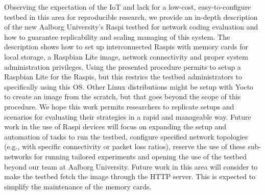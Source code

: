 \label{sec:conclusions}
Observing the expectation of the \ac{IoT} and lack for a low-cost, easy-to-configure testbed in this area for reproducible research, we provide an in-depth description of the new Aalborg University's \ac{Raspi} testbed for network coding evaluation and how to guarantee replicability and scaling managing of this system. The description shows how to set up interconnected \ac{Raspi}s with memory cards for local storage, a Raspbian Lite image, network connectivity and proper system administration privileges. Using the presented procedure permits to setup a Raspbian Lite for the \ac{Raspi}s, but this restrics the testbed administrators to specifically using this \ac{OS}. Other Linux distributions might be setup with Yocto  to create an image from the scratch, but that goes beyond the scope of this procedure.  We hope this work permits researchers to replicate setups and scenarios for evaluating their strategies in a rapid and manageable way. Future work in the use of \ac{Raspi} devices will focus on expanding the setup and automation of tasks to run the testbed, configure specified network topologies (e.g., with specific connectivity or packet loss ratios), reserve the use of these sub-networks for running tailored experiments and opening the use of the testbed beyond our team at Aalborg University. Future work in this area will consider to make the testbed fetch the image through the \ac{HTTP} server. This is expected to simplify the maintenance of the memory cards.
